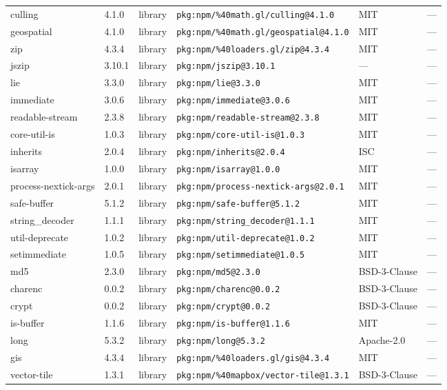 \documentclass[11pt]{article}
\begin{document}
\begin{longtable}{|l|l|l|p{2.2cm}|l|p{4cm}|}
culling & 4.1.0 & library & \texttt{pkg:npm/\%40math.gl/culling@4.1.0} & MIT & — \\
geospatial & 4.1.0 & library & \texttt{pkg:npm/\%40math.gl/geospatial@4.1.0} & MIT & — \\
zip & 4.3.4 & library & \texttt{pkg:npm/\%40loaders.gl/zip@4.3.4} & MIT & — \\
jszip & 3.10.1 & library & \texttt{pkg:npm/jszip@3.10.1} & — & — \\
lie & 3.3.0 & library & \texttt{pkg:npm/lie@3.3.0} & MIT & — \\
immediate & 3.0.6 & library & \texttt{pkg:npm/immediate@3.0.6} & MIT & — \\
readable-stream & 2.3.8 & library & \texttt{pkg:npm/readable-stream@2.3.8} & MIT & — \\
core-util-is & 1.0.3 & library & \texttt{pkg:npm/core-util-is@1.0.3} & MIT & — \\
inherits & 2.0.4 & library & \texttt{pkg:npm/inherits@2.0.4} & ISC & — \\
isarray & 1.0.0 & library & \texttt{pkg:npm/isarray@1.0.0} & MIT & — \\
process-nextick-args & 2.0.1 & library & \texttt{pkg:npm/process-nextick-args@2.0.1} & MIT & — \\
safe-buffer & 5.1.2 & library & \texttt{pkg:npm/safe-buffer@5.1.2} & MIT & — \\
string\_decoder & 1.1.1 & library & \texttt{pkg:npm/string\_decoder@1.1.1} & MIT & — \\
util-deprecate & 1.0.2 & library & \texttt{pkg:npm/util-deprecate@1.0.2} & MIT & — \\
setimmediate & 1.0.5 & library & \texttt{pkg:npm/setimmediate@1.0.5} & MIT & — \\
md5 & 2.3.0 & library & \texttt{pkg:npm/md5@2.3.0} & BSD-3-Clause & — \\
charenc & 0.0.2 & library & \texttt{pkg:npm/charenc@0.0.2} & BSD-3-Clause & — \\
crypt & 0.0.2 & library & \texttt{pkg:npm/crypt@0.0.2} & BSD-3-Clause & — \\
is-buffer & 1.1.6 & library & \texttt{pkg:npm/is-buffer@1.1.6} & MIT & — \\
long & 5.3.2 & library & \texttt{pkg:npm/long@5.3.2} & Apache-2.0 & — \\
gis & 4.3.4 & library & \texttt{pkg:npm/\%40loaders.gl/gis@4.3.4} & MIT & — \\
vector-tile & 1.3.1 & library & \texttt{pkg:npm/\%40mapbox/vector-tile@1.3.1} & BSD-3-Clause & — \\

\end{longtable}
\end{document}
